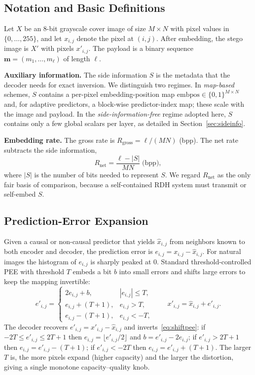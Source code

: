 \documentclass[journal,article,submit,pdftex,moreauthors]{Definitions/mdpi}
\begin{document}
\subsection{Notation and Basic Definitions}\label{sec:notation}
Let $X$ be an $8$-bit grayscale cover image of size $M\times N$ with pixel values in $\{0,\ldots,255\}$, and let $x_{i,j}$ denote the pixel at $(i,j)$. After embedding, the stego image is $X'$ with pixels $x'_{i,j}$. The payload is a binary sequence $\mathbf{m}=(m_1,\ldots,m_\ell)$ of length $\ell$.

\textbf{Auxiliary information.} The side information $S$ is the metadata that the decoder needs for exact inversion. We distinguish two regimes. In \emph{map-based} schemes, $S$ contains a per-pixel embedding-position map $\mathrm{embpos}\in\{0,1\}^{M\times N}$ and, for adaptive predictors, a block-wise predictor-index map; these scale with the image and payload. In the \emph{side-information-free} regime adopted here, $S$ contains only a few global scalars per layer, as detailed in Section~\ref{sec:sideinfo}.

\textbf{Embedding rate.} The gross rate is $R_{\mathrm{gross}}=\ell/(MN)$ (bpp). The net rate subtracts the side information,
\begin{equation}
R_{\mathrm{net}}=\frac{\ell-|S|}{MN}\;\text{(bpp)},\label{eq:rnet}
\end{equation}
where $|S|$ is the number of bits needed to represent $S$. We regard $R_{\mathrm{net}}$ as the only fair basis of comparison, because a self-contained RDH system must transmit or self-embed $S$.

\subsection{Prediction-Error Expansion}\label{sec:pee}
Given a causal or non-causal predictor that yields $\hat{x}_{i,j}$ from neighbors known to both encoder and decoder, the prediction error is $e_{i,j}=x_{i,j}-\hat{x}_{i,j}$. For natural images the histogram of $e_{i,j}$ is sharply peaked at $0$. Standard threshold-controlled PEE with threshold $T$ embeds a bit $b$ into small errors and shifts large errors to keep the mapping invertible:
\begin{equation}
e'_{i,j}=\begin{cases}
2e_{i,j}+b, & |e_{i,j}|\le T,\\
e_{i,j}+(T+1), & e_{i,j}>T,\\
e_{i,j}-(T+1), & e_{i,j}<-T,
\end{cases}\qquad x'_{i,j}=\hat{x}_{i,j}+e'_{i,j}.\label{eq:shiftpee}
\end{equation}
The decoder recovers $e'_{i,j}=x'_{i,j}-\hat{x}_{i,j}$ and inverts~\eqref{eq:shiftpee}: if $-2T\le e'_{i,j}\le 2T+1$ then $e_{i,j}=\lfloor e'_{i,j}/2\rfloor$ and $b=e'_{i,j}-2e_{i,j}$; if $e'_{i,j}>2T+1$ then $e_{i,j}=e'_{i,j}-(T+1)$; if $e'_{i,j}<-2T$ then $e_{i,j}=e'_{i,j}+(T+1)$. The larger $T$ is, the more pixels expand (higher capacity) and the larger the distortion, giving a single monotone capacity--quality knob.
\end{document}
